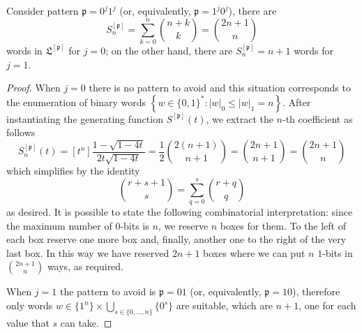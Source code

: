 \begin{coro}
Consider pattern $\mathfrak{p}=0^{j}1^{j}$ (or, equivalently,
$\mathfrak{p}=1^{j}0^{j}$), there are
\begin{displaymath}
S_{n}^{[\mathfrak{p}]}=\sum_{k=0}^{n}{{{n+k}\choose{k}}}={{2n+1}\choose{n}}
\end{displaymath}
words in $\mathfrak{L}^{[\mathfrak{p}]}$ for $j=0$; on the other hand, there
are $S_{n}^{[\mathfrak{p}]} = n+1$ words for $j=1$.
\end{coro}

\begin{proof}
When $j=0$ there is no pattern to avoid and this situation corresponds to the
enumeration of binary words $\left\lbrace w\in \lbrace 0,1 \rbrace^{*}: |w|_{0}
\leq |w|_{1}=n\right\rbrace$.  After instantiating the generating function
$S^{[\mathfrak{p}]}(t)$, we extract the $n$-th coefficient as follows
\begin{displaymath}
[t^{n}] S_{n}^{[\mathfrak{p}]}(t) =[t^{n}]\frac{1-\sqrt{1-4t}}{2t\sqrt{1-4t}}
= \frac{1}{2}{{2(n+1)}\choose{n+1}}
= {{2n+1}\choose{n+1}}
= {{2n+1}\choose{n}}
\end{displaymath}
which simplifies by the identity
\begin{displaymath}
{{r+s+1}\choose{s}} = \sum_{q=0}^{s}{{{r+q}\choose{q}}}
\end{displaymath}
as desired. It is possible to state the following combinatorial interpretation:
since the maximum number of $0$-bits  is $n$, we reserve $n$ boxes for them. To the
left of each box reserve one more box and, finally, another one to the right of
the very last box. In this way we have reserved $2n+1$ boxes where we can put
$n$ $1$-bits  in ${{2n+1}\choose{n}}$ ways, as required.

When $j=1$ the pattern to avoid is $\mathfrak{p}=01$ (or, equivalently,
$\mathfrak{p}=10$), therefore only words $w \in   \lbrace 1^{n}
\rbrace\times\bigcup_{s\in \lbrace 0,\ldots,n \rbrace}\lbrace 0^{s} \rbrace$
are suitable, which are $n+1$, one for each value that $s$ can take.
\end{proof}

